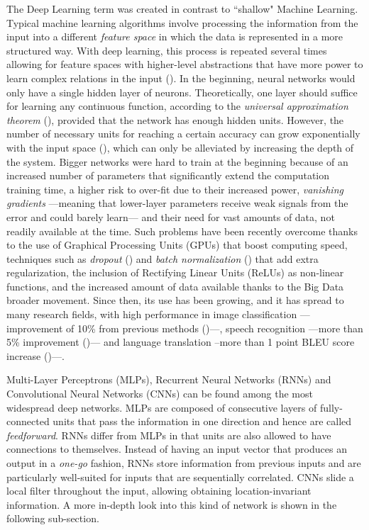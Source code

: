 The Deep Learning term was created in contrast to ``shallow" Machine Learning. Typical machine learning algorithms involve processing the information from the input into a different \textit{feature space} in which the data is represented in a more structured way. With deep learning, this process is repeated several times allowing for feature spaces with higher-level abstractions that have more power to learn complex relations in the input (\cite{Goodfellow-et-al-2016}). In the beginning, neural networks would only have a single hidden layer of neurons. Theoretically, one layer should suffice for learning any continuous function, according to the \textit{universal approximation theorem} (\cite{Cybenko1989}), provided that the network has enough hidden units. However, the number of necessary units for reaching a certain accuracy can grow exponentially with the input space (\cite{Barron1993}), which can only be alleviated by increasing the depth of the system. Bigger networks were hard to train at the beginning because of an increased number of parameters that significantly extend the computation training time, a higher risk to over-fit due to their increased power, \textit{vanishing gradients} ---meaning that lower-layer parameters receive weak signals from the error and could barely learn--- and their need for vast amounts of data, not readily available at the time. Such problems have been recently overcome thanks to the use of Graphical Processing Units (GPUs) that boost computing speed, techniques such as \textit{dropout} (\cite{Srivastava2014}) and \textit{batch normalization} (\cite{SergeyIoffe2015}) that add extra regularization, the inclusion of Rectifying Linear Units (ReLUs) as non-linear functions, and the increased amount of data available thanks to the Big Data broader movement. Since then, its use has been growing, and it has spread to many research fields, with high performance in image classification ---improvement of 10\% from previous methods (\cite{NIPS2012_4824})---, speech recognition ---more than 5\% improvement (\cite{Vesely2013})--- and language translation --more than 1 point BLEU score increase (\cite{Cho2014})---.

Multi-Layer Perceptrons (MLPs), Recurrent Neural Networks (RNNs) and Convolutional Neural Networks (CNNs) can be found among the most widespread deep networks. MLPs are composed of consecutive layers of fully-connected units that pass the information in one direction and hence are called \textit{feedforward}. RNNs differ from MLPs in that units are also allowed to have connections to themselves. Instead of having an input vector that produces an output in a \textit{one-go} fashion, RNNs store information from previous inputs and are particularly well-suited for inputs that are sequentially correlated. CNNs slide a local filter throughout the input, allowing obtaining location-invariant information. A more in-depth look into this kind of network is shown in the following sub-section.


